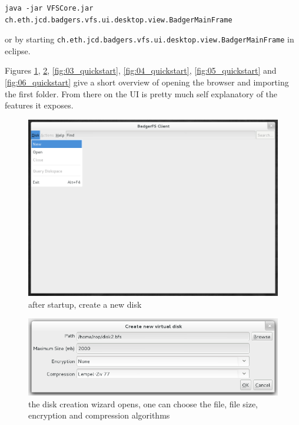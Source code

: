 \begin{verbatim}
java -jar VFSCore.jar ch.eth.jcd.badgers.vfs.ui.desktop.view.BadgerMainFrame
\end{verbatim}

or by starting \verb|ch.eth.jcd.badgers.vfs.ui.desktop.view.BadgerMainFrame| in eclipse.

Figures \ref{fig:01_quickstart}, \ref{fig:02_quickstart},
\ref{fig:03_quickstart}, \ref{fig:04_quickstart}, \ref{fig:05_quickstart} and
\ref{fig:06_quickstart} give a short overview of opening the browser and
importing the first folder. From there on the UI is pretty much self explanatory
of the features it exposes.

\begin{figure}[h!]
\centering
\includegraphics[width=1\textwidth]{figures/01_quickstart.png}
\caption{after startup, create a new disk}
\label{fig:01_quickstart}
\end{figure}

\begin{figure}[h!]
\centering
\includegraphics[width=1\textwidth]{figures/02_quickstart.png}
\caption{the disk creation wizard opens, one can choose the file, file size,
encryption and compression algorithms}
\label{fig:02_quickstart}
\end{figure}

